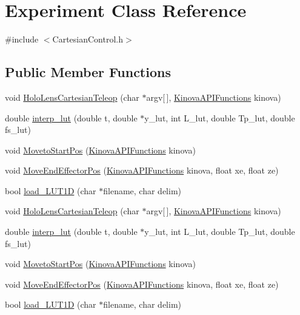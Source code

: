 \hypertarget{classExperiment}{}\section{Experiment Class Reference}
\label{classExperiment}


{\ttfamily \#include $<$Cartesian\+Control.\+h$>$}

\subsection*{Public Member Functions}
\begin{DoxyCompactItemize}
\item 
void \hyperlink{classExperiment_a6b40f95a20017941c6cb3e0d120bc998}{Holo\+Lens\+Cartesian\+Teleop} (char $\ast$argv\mbox{[}$\,$\mbox{]}, \hyperlink{classKinovaAPIFunctions}{Kinova\+A\+P\+I\+Functions} kinova)
\item 
double \hyperlink{classExperiment_a33a2f22c61afa5e85cb5a9004d62b4b3}{interp\+\_\+lut} (double t, double $\ast$y\+\_\+lut, int L\+\_\+lut, double Tp\+\_\+lut, double fs\+\_\+lut)
\item 
void \hyperlink{classExperiment_afe22dc21cf9b4a7b07ebb2f9b7eeafce}{Moveto\+Start\+Pos} (\hyperlink{classKinovaAPIFunctions}{Kinova\+A\+P\+I\+Functions} kinova)
\item 
void \hyperlink{classExperiment_a964fe7c5d4f78565bd98f3f1c860a01c}{Move\+End\+Effector\+Pos} (\hyperlink{classKinovaAPIFunctions}{Kinova\+A\+P\+I\+Functions} kinova, float xe, float ze)
\item 
bool \hyperlink{classExperiment_aedc226b0d88508dc7576686f808de0ea}{load\+\_\+\+L\+U\+T1D} (char $\ast$filename, char delim)
\item 
void \hyperlink{classExperiment_a6b40f95a20017941c6cb3e0d120bc998}{Holo\+Lens\+Cartesian\+Teleop} (char $\ast$argv\mbox{[}$\,$\mbox{]}, \hyperlink{classKinovaAPIFunctions}{Kinova\+A\+P\+I\+Functions} kinova)
\item 
double \hyperlink{classExperiment_a33a2f22c61afa5e85cb5a9004d62b4b3}{interp\+\_\+lut} (double t, double $\ast$y\+\_\+lut, int L\+\_\+lut, double Tp\+\_\+lut, double fs\+\_\+lut)
\item 
void \hyperlink{classExperiment_afe22dc21cf9b4a7b07ebb2f9b7eeafce}{Moveto\+Start\+Pos} (\hyperlink{classKinovaAPIFunctions}{Kinova\+A\+P\+I\+Functions} kinova)
\item 
void \hyperlink{classExperiment_a964fe7c5d4f78565bd98f3f1c860a01c}{Move\+End\+Effector\+Pos} (\hyperlink{classKinovaAPIFunctions}{Kinova\+A\+P\+I\+Functions} kinova, float xe, float ze)
\item 
bool \hyperlink{classExperiment_aedc226b0d88508dc7576686f808de0ea}{load\+\_\+\+L\+U\+T1D} (char $\ast$filename, char delim)
\end{DoxyCompactItemize}
